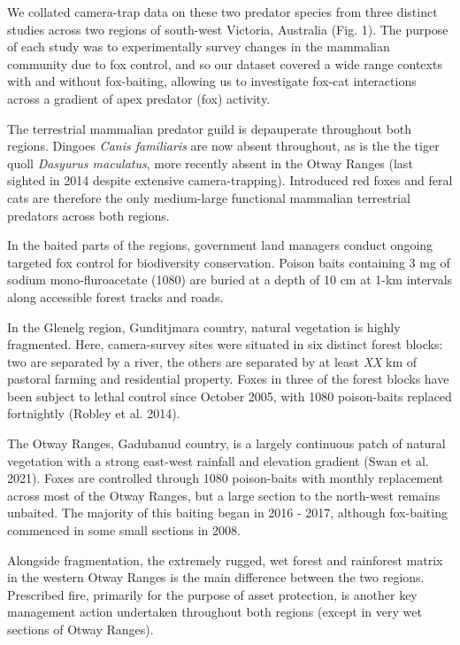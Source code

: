 \documentclass[]{elsarticle} %
\begin{document}
We collated camera-trap data on these two predator species from three distinct studies across two regions of south-west Victoria, Australia (Fig. 1). The purpose of each study was to experimentally survey changes in the mammalian community due to fox control, and so our dataset covered a wide range contexts with and without fox-baiting, allowing us to investigate fox-cat interactions across a gradient of apex predator (fox) activity.

The terrestrial mammalian predator guild is depauperate throughout both regions. Dingoes \emph{Canis familiaris} are now absent throughout, as is the the tiger quoll \emph{Dasyurus maculatus}, more recently absent in the Otway Ranges (last sighted in 2014 despite extensive camera-trapping). Introduced red foxes and feral cats are therefore the only medium-large functional mammalian terrestrial predators across both regions.

In the baited parts of the regions, government land managers conduct ongoing targeted fox control for biodiversity conservation. Poison baits containing 3 mg of sodium mono-fluroacetate (1080) are buried at a depth of 10 cm at 1-km intervals along accessible forest tracks and roads.

In the Glenelg region, Gunditjmara country, natural vegetation is highly fragmented. Here, camera-survey sites were situated in six distinct forest blocks: two are separated by a river, the others are separated by at least \emph{XX} km of pastoral farming and residential property. Foxes in three of the forest blocks have been subject to lethal control since October 2005, with 1080 poison-baits replaced fortnightly (Robley et al. 2014).

The Otway Ranges, Gadubanud country, is a largely continuous patch of natural vegetation with a strong east-west rainfall and elevation gradient (Swan et al. 2021). Foxes are controlled through 1080 poison-baits with monthly replacement across most of the Otway Ranges, but a large section to the north-west remains unbaited. The majority of this baiting began in 2016 - 2017, although fox-baiting commenced in some small sections in 2008.

Alongside fragmentation, the extremely rugged, wet forest and rainforest matrix in the western Otway Ranges is the main difference between the two regions. Prescribed fire, primarily for the purpose of asset protection, is another key management action undertaken throughout both regions (except in very wet sections of Otway Ranges).
\end{document}
